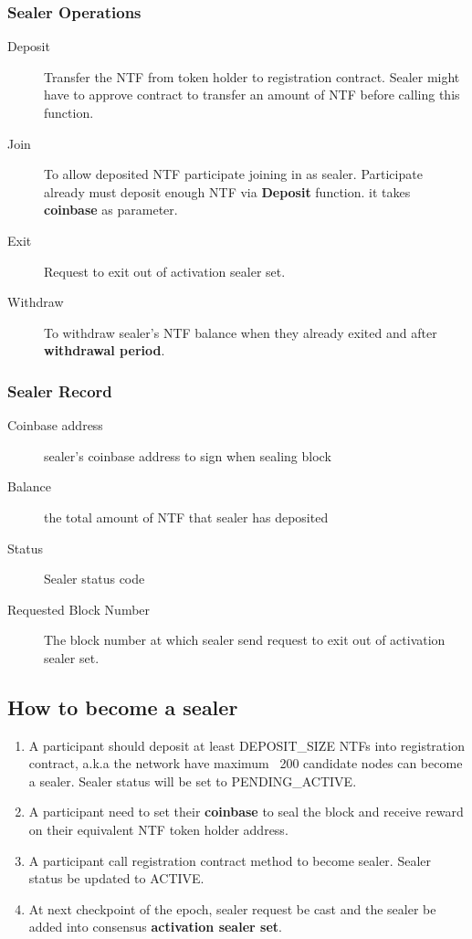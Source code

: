 \documentclass[12pt,oneside]{amsart}
\begin{document}
\begin{multicols}{2}
\subsubsection{Sealer Operations}
\begin{description}
\item[Deposit] Transfer the {\small NTF} from token holder to registration contract. Sealer might have to approve contract to transfer an amount of {\small NTF} before calling this function.
\item[Join] To allow deposited {\small NTF} participate joining in as sealer. Participate already must deposit enough {\small NTF} via \textbf{Deposit} function. it takes \textbf{coinbase} as parameter.
\item[Exit] Request to exit out of activation sealer set.	
\item[Withdraw] To withdraw sealer’s {\small NTF} balance when they already exited and after \textbf{withdrawal period}.
\end{description}

\subsubsection{Sealer Record}
\begin{description}
\item[Coinbase address] sealer’s coinbase address to sign when sealing block
\item[Balance] the total amount of {\small NTF} that sealer has deposited
\item[Status] Sealer status code
\item[Requested Block Number] The block number at which sealer send request to exit out of activation sealer set.
\end{description}

\subsection{How to become a sealer}
\begin{enumerate}
\item A participant should deposit at least {\small DEPOSIT\_SIZE} {\small NTFs} into registration contract, a.k.a the network have maximum ~200 candidate nodes can become a sealer. Sealer status will be set to {\small PENDING\_ACTIVE}.
\item A participant need to set their \textbf{coinbase} to seal the block and receive reward on their equivalent {\small NTF} token holder address.
\item A participant call registration contract method to become sealer. Sealer status be updated to {\small ACTIVE}.
\item At next checkpoint of the epoch, sealer request be cast and the sealer be added into consensus \textbf{activation sealer set}.
\end{enumerate}


\end{multicols}
\end{document}
